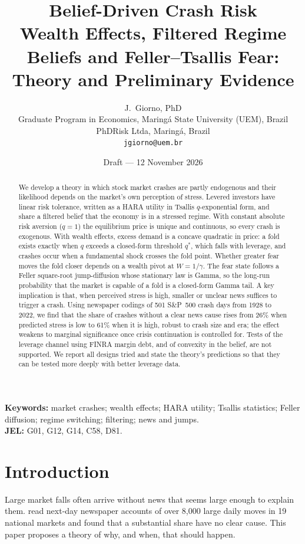 \documentclass[11pt,a4paper]{article}
\title{\textbf{Belief-Driven Crash Risk}\\[4pt]
\large Wealth Effects, Filtered Regime Beliefs and Feller--Tsallis Fear:\\
Theory and Preliminary Evidence}
\author{J.~Giorno, PhD\\[2pt]
\small Graduate Program in Economics, Maring\'a State University (UEM), Brazil\\
\small PhDRisk Ltda, Maring\'a, Brazil\\
\small \texttt{jgiorno@uem.br}}
\date{Draft --- 12 November 2026}
\theoremstyle{remark}
\begin{document}
\maketitle

\begin{abstract}
\noindent We develop a theory in which stock market crashes are partly endogenous and
their likelihood depends on the market's own perception of stress. Levered investors have
linear risk tolerance, written as a HARA utility in Tsallis $q$-exponential form, and share
a filtered belief that the economy is in a stressed regime. With constant absolute risk
aversion ($q=1$) the equilibrium price is unique and continuous, so every crash is
exogenous. With wealth effects, excess demand is a concave quadratic in price: a fold exists
exactly when $q$ exceeds a closed-form threshold $q^*$, which falls with leverage, and
crashes occur when a fundamental shock crosses the fold point. Whether greater fear moves
the fold closer depends on a wealth pivot at $W=1/\gamma$. The fear state follows a Feller
square-root jump-diffusion whose stationary law is Gamma, so the long-run probability that
the market is capable of a fold is a closed-form Gamma tail. A key implication is that,
when perceived stress is high, smaller or unclear news suffices to trigger a crash. Using
newspaper codings of 501 S\&P~500 crash days from 1928 to 2022, we find that the share of
crashes without a clear news cause rises from 26\% when predicted stress is low to 61\% when
it is high, robust to crash size and era; the effect weakens to marginal significance once
crisis continuation is controlled for. Tests of the leverage channel using FINRA margin
debt, and of convexity in the belief, are not supported. We report all designs tried and
state the theory's predictions so that they can be tested more deeply with better leverage
data.
\end{abstract}

\noindent\textbf{Keywords:} market crashes; wealth effects; HARA utility; Tsallis
statistics; Feller diffusion; regime switching; filtering; news and jumps.\\
\textbf{JEL:} G01, G12, G14, C58, D81.

\section{Introduction}

Large market falls often arrive without news that seems large enough to explain them.
\citet{BBDS2021} read next-day newspaper accounts of over 8,000 large daily moves in 19
national markets and found that a substantial share have no clear cause. This paper proposes
a theory of why, and when, that should happen.
\end{document}
